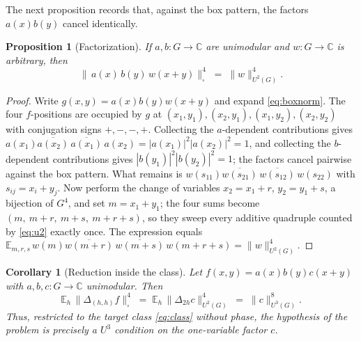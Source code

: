 \documentclass[11pt]{article}
\newtheorem{proposition}{Proposition}
\newtheorem{corollary}{Corollary}
\theoremstyle{remark}
\begin{document}
The next proposition records that, against the box pattern, the factors
$a(x)b(y)$ cancel identically.

\begin{proposition}[Factorization]\label{prop:B}
If $a,b:G\to\mathbb{C}$ are unimodular and $w:G\to\mathbb{C}$ is arbitrary,
then
\[
\bigl\|\,a(x)\,b(y)\,w(x+y)\bigr\|_\square^4\;=\;\|w\|_{U^2(G)}^4 .
\]
\end{proposition}

\begin{proof}
Write $g(x,y)=a(x)b(y)w(x+y)$ and expand \eqref{eq:boxnorm}. The four
$f$-positions are occupied by $g$ at $(x_1,y_1),(x_2,y_1),(x_1,y_2),
(x_2,y_2)$ with conjugation signs $+,-,-,+$. Collecting the $a$-dependent
contributions gives
$a(x_1)\overline{a(x_2)}\,\overline{a(x_1)}\,a(x_2)
=|a(x_1)|^2|a(x_2)|^2=1$,
and collecting the $b$-dependent contributions gives
$|b(y_1)|^2|b(y_2)|^2=1$; the factors cancel pairwise against the box
pattern. What remains is
$w(s_{11})\overline{w(s_{21})}\,\overline{w(s_{12})}\,w(s_{22})$ with
$s_{ij}=x_i+y_j$. Now perform the change of variables
$x_2=x_1+r$, $y_2=y_1+s$, a bijection of $G^4$, and set $m=x_1+y_1$; the
four sums become $(m,\ m+r,\ m+s,\ m+r+s)$, so they sweep every additive
quadruple counted by \eqref{eq:u2} exactly once. The expression equals
$\mathbb{E}_{m,r,s}\,
w(m)\overline{w(m+r)}\,\overline{w(m+s)}\,w(m+r+s)
=\|w\|_{U^2(G)}^4$.
\end{proof}

\begin{corollary}[Reduction inside the class]\label{cor:reduction}
Let $f(x,y)=a(x)b(y)c(x+y)$ with $a,b,c:G\to\mathbb{C}$ unimodular. Then
\begin{equation}\label{eq:u3reduction}
\mathbb{E}_h\,\bigl\|\Delta_{(h,h)}f\bigr\|_\square^4
\;=\;\mathbb{E}_h\,\|\Delta_{2h}c\|_{U^2(G)}^4
\;=\;\|c\|_{U^3(G)}^8 .
\end{equation}
Thus, restricted to the target class \eqref{eq:class} without phase, the
hypothesis of the problem is precisely a $U^3$ condition on the one-variable
factor $c$.
\end{corollary}
\end{document}
